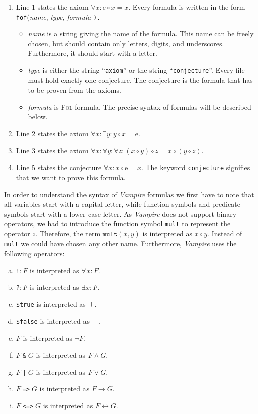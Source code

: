 \begin{enumerate}
\item Line 1 states the axiom $\forall x: \mathrm{e} \circ x = x$.  Every formula is written in the form
      \\[0.2cm]
      \hspace*{1.3cm}
      \texttt{fof}(\textsl{name}, \textsl{type}, \textsl{formula} \texttt{).}
      \begin{itemize}
      \item \textsl{name} is a string giving the name of the formula.  This name can be freely chosen,
            but should contain only letters, digits, and underscores.  Furthermore, it should start with a letter.
      \item \textsl{type} is either the string ``\texttt{axiom}'' or the string ``\texttt{conjecture}''.
            Every file must hold exactly one conjecture.  The conjecture is the formula that has to be proven from the
            axioms.
      \item \textsl{formula} is \textsc{Fol} formula.  The precise syntax of formulas will be described below.
      \end{itemize}
\item Line 2 states the axiom $\forall x: \exists y: y \circ x = \mathrm{e}$.
\item Line 3 states the axiom $\forall x: \forall y: \forall z: (x \circ y) \circ z = x \circ (y \circ z)$.
\item Line 5 states the conjecture $\forall x: x \circ \mathrm{e} = x$.  The keyword \texttt{conjecture}
      signifies that we want to prove this formula.  
\end{enumerate}
In order to understand the syntax of \textsl{Vampire} formulas we first have to note that all variables start
with a capital letter, while function symbols and predicate symbols start with a lower case letter.  As
\textsl{Vampire} does not support binary operators, we had to introduce the function symbol \texttt{mult} to
represent the operator $\circ$.  Therefore, the term $\mathtt{mult}(x, y)$ is interpreted as $x \circ y$.
Instead of \texttt{mult} we could have chosen any other name.  Furthermore, \textsl{Vampire} uses the following
operators:
\begin{enumerate}[(a)]
\item \texttt{!\;[X]}$:F$ is interpreted as $\forall x: F$.
\item \texttt{?\;[X]}$:F$ is interpreted as $\exists x:F$.
\item \texttt{\$true} is interpreted as $\top$.
\item \texttt{\$false} is interpreted as $\bot$.
\item \texttt{}$F$ is interpreted as $\neg F$.
\item $F\;$\texttt{\&}$\;G$ is interpreted as $F \wedge G$.
\item $F\;$\texttt{|}$\;G$ is interpreted as $F \vee G$.
\item $F\;$\texttt{=>}$\;G$ is interpreted as $F \rightarrow G$.
\item $F\;$\texttt{<=>}$\;G$ is interpreted as $F \leftrightarrow G$.
\end{enumerate}

